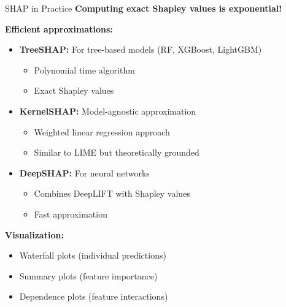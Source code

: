 \documentclass[aspectratio=169]{beamer}
\begin{document}
\begin{frame}{SHAP in Practice}
  \textbf{Computing exact Shapley values is exponential!}

  \vspace{0.5em}

  \textbf{Efficient approximations:}

  \begin{itemize}
    \item \textbf{TreeSHAP:} For tree-based models (RF, XGBoost, LightGBM)
    \begin{itemize}
      \item Polynomial time algorithm
      \item Exact Shapley values
    \end{itemize}

    \item \textbf{KernelSHAP:} Model-agnostic approximation
    \begin{itemize}
      \item Weighted linear regression approach
      \item Similar to LIME but theoretically grounded
    \end{itemize}

    \item \textbf{DeepSHAP:} For neural networks
    \begin{itemize}
      \item Combines DeepLIFT with Shapley values
      \item Fast approximation
    \end{itemize}
  \end{itemize}

  \vspace{0.5em}

  \textbf{Visualization:}
  \begin{itemize}
    \item Waterfall plots (individual predictions)
    \item Summary plots (feature importance)
    \item Dependence plots (feature interactions)
  \end{itemize}
\end{frame}
\end{document}
